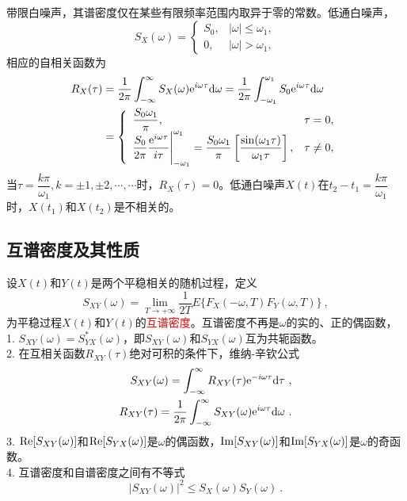 \documentclass[12pt,a4paper]{article}
\newcommand{\dif}{\mathrm{d}}
\begin{document}
带限白噪声，其谱密度仅在某些有限频率范围内取异于零的常数。低通白噪声，
\begin{equation*}
S_X(\omega) = \left\{\begin{array}{ll}
S_0, & |\omega| \leqslant \omega_1,\\
0 , & |\omega| > \omega_1 ,
\end{array}\right.
\end{equation*}
相应的自相关函数为
\begin{align*}
R_X(\tau) &= \dfrac{1}{2\pi} \int_{-\infty}^\infty S_X(\omega) {\rm e}^{i\omega \tau} \dif \omega =  \dfrac{1}{2\pi} \int_{-\omega_1}^{\omega_1} S_0 {\rm e}^{i\omega \tau} \dif \omega \\
&=  \left\{\begin{array}{ll}
\dfrac{S_0 \omega_1}{\pi}, & \tau = 0,\\
\dfrac{S_0}{2\pi} \dfrac{{\rm e}^{i\omega \tau}}{i\tau} \Bigg|_{-\omega_1}^{\omega_1} = \dfrac{S_0 \omega_1}{\pi} \left[\dfrac{\sin(\omega_1 \tau)}{\omega_1 \tau}  \right], & \tau \neq 0 ,
\end{array}\right.
\end{align*}
当$\tau =\dfrac{k\pi}{\omega_1}, k = \pm 1, \pm 2, \cdots, \cdots$时，$R_X(\tau) = 0$。低通白噪声$X(t)$在$t_2-t_1 = \dfrac{k\pi}{\omega_1}$时，$X(t_1)$和$X(t_2)$是不相关的。


\subsection{互谱密度及其性质}
设$X(t)$和$Y(t)$是两个平稳相关的随机过程，定义
\begin{equation}
S_{XY} (\omega) = \underset{T\rightarrow +\infty}\lim \dfrac{1}{2T} E\{F_X(-\omega, T) F_Y(\omega, T)\} ~,
\end{equation}
为平稳过程$X(t)$和$Y(t)$的\textcolor{red}{互谱密度}。互谱密度不再是$\omega$的实的、正的偶函数，\\
1. $S_{XY} (\omega) = S^\ast_{YX}(\omega) $，即$S_{XY} (\omega)$和$S_{YX} (\omega)$互为共轭函数。\\
2. 在互相关函数$R_{XY}(\tau)$绝对可积的条件下，维纳-辛钦公式
\begin{align}
S_{XY}(\omega) = \int_{-\infty}^\infty R_{XY}(\tau) {\rm e}^{-i\omega \tau} \dif \tau ~, \\
R_{XY}(\tau) = \dfrac{1}{2\pi} \int_{-\infty}^\infty S_{XY}(\omega) {\rm e}^{i\omega \tau} \dif \omega ~.
\end{align}
3. ${\rm Re}[S_{XY}(\omega)]$和${\rm Re}[S_{YX}(\omega)]$是$\omega$的偶函数，${\rm Im}[S_{XY}(\omega)]$和${\rm Im}[S_{YX}(\omega)]$是$\omega$的奇函数。\\
4. 互谱密度和自谱密度之间有不等式
\begin{equation*}
|S_{XY}(\omega)|^2 \leqslant S_{X}(\omega) S_{Y}(\omega) ~.
\end{equation*}
\end{document}
